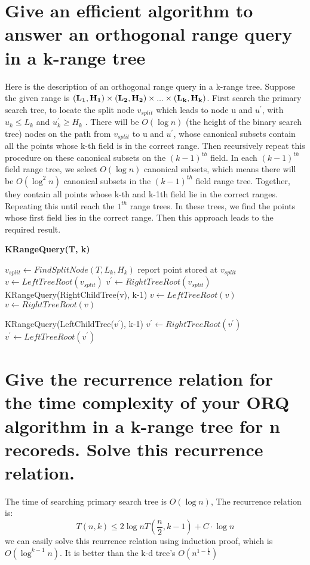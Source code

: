 \documentclass[12pt,a4paper]{report}
\begin{document}
\section{Give an efficient algorithm to answer an orthogonal range query in a k-range tree}
Here is the description of an orthogonal range query in a k-range tree. Suppose the given range is $\bf (L_1, H_1) \times (L_2, H_2) \times ... \times (L_k, H_k) $. First search the primary search tree, to locate the split node $v_{split}$ which leads to node u and $u^{'}$, with $u_{k} \leq L_{k}$ and $u_{k}^{'} \geq H_{k}$ . There will be $O(\log n)$ (the height of the binary search tree) nodes on the path from $v_{split}$ to u and $u^{'}$, whose canonical subsets contain all the points whose k-th field is in the correct range. Then recursively repeat this procedure on these canonical subsets on the $(k-1)^{th}$ field. In each $(k-1)^{th}$ field range tree, we select $O(\log n)$ canonical subsets, which means there will be $O(\log^{2} n)$ canonical subsets in the $(k-1)^{th}$ field range tree. Together, they contain all points whose k-th and k-1th field lie in the correct ranges. Repeating this until reach the $1^{th}$ range trees. In these trees, we find the points whose first field lies in the correct range. Then this approach leads to the required result.

\begin{algorithm}
\caption{\bf KRangeQuery(T, k)}
\begin{algorithmic}[1]

   \STATE $v_{split} \leftarrow FindSplitNode(T, L_{k}, H_{k})$
   \STATE report point stored at $v_{split}$
   \ELSE
   \STATE $v \leftarrow LeftTreeRoot(v_{split})$
   \STATE $v^{'} \leftarrow RightTreeRoot(v_{split})$
   \ENDIF
   		\STATE KRangeQuery(RightChildTree(v), k-1)
   		\STATE $v \leftarrow LeftTreeRoot(v)$
		\ELSE
		\STATE $v \leftarrow RightTreeRoot(v)$
   		\ENDIF
   \ENDWHILE
   
   		\STATE KRangeQuery(LeftChildTree($v^{'}$), k-1)
   		\STATE $v^{'} \leftarrow RightTreeRoot(v^{'})$
		\ELSE
		\STATE $v^{'} \leftarrow LeftTreeRoot(v^{'})$
   		\ENDIF
   \ENDWHILE
\end{algorithmic}
\end{algorithm}

\section{Give the recurrence relation for the time complexity of your ORQ algorithm in a k-range tree for n recoreds. Solve this recurrence relation.}
The time of searching primary search tree is $O(\log n)$, The recurrence relation is:
$$
T(n, k) \leq 2\log nT(\frac {n}{2}, k-1) + C \cdot \log n
$$
we can easily solve this reurrence relation using induction proof, which is $O(\log^{k-1} n)$. It is better than the k-d tree's $O(n^{1- \frac {1}{k}})$
\end{document}
